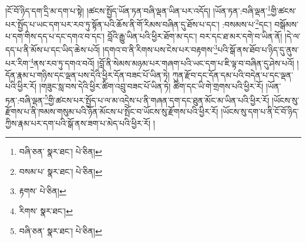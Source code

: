 །ངོ་བོ་ཉིད་དག་དྲི་མ་དག་པ་སྟེ། །ཚངས་སྤྱོད་ཡོན་ཏན་བཞི་ལྡན་ཡིན་པར་འདོད། །ཡོན་ཏན་:བཞི་ལྡན་\footnote{བཞི་ཅན་  སྣར་ཐང་།  པེ་ཅིན། }གྱི་ཚངས་པར་སྤྱོད་པ་ཡང་དག་པར་རབ་ཏུ་སྟོན་པའི་ཆོས་ནི་གོ་རིམས་བཞིན་དུ་ཐོས་པ་དང་། :བསམས་པ་\footnote{བསམ་པ་  སྣར་ཐང་།  པེ་ཅིན། }དང་། བསྒོམས་པ་དག་གིས་དད་པ་དང་དགའ་བ་དང་། བློའི་རྒྱུ་ཡིན་པའི་ཕྱིར་ཐོག་མ་དང་། བར་དང་ཐ་མར་དགེ་བ་ཡིན་ནོ། །དེ་ལ་དད་པ་ནི་མོས་པ་དང་ཡིད་ཆེས་པའོ། །དགའ་བ་ནི་རིགས་པས་ངེས་པར་བརྟགས་\footnote{རྟགས་  པེ་ཅིན། }པའི་སྒོ་ནས་ཐོབ་པ་ཉིད་དུ་ནུས་པར་རིག་\footnote{རིགས་  སྣར་ཐང་། }ནས་རབ་ཏུ་དགའ་བའོ། །བློ་ནི་སེམས་མཉམ་པར་གཞག་པའི་ཡང་དག་པ་ཇི་ལྟ་བ་བཞིན་དུ་ཤེས་པའོ། །དོན་རྣམ་པ་གཉིས་དང་ལྡན་པས་དེའི་ཕྱིར་དོན་བཟང་པོ་ཡིན་ཏེ། ཀུན་རྫོབ་དང་དོན་དམ་པའི་བདེན་པ་དང་ལྡན་པའི་ཕྱིར་རོ། །གཟུང་སླ་བས་དེའི་ཕྱིར་ཚིག་འབྲུ་བཟང་པོ་ཡིན་ཏེ། ཚིག་དང་ཡི་གེ་གྲགས་པའི་ཕྱིར་རོ། །ཡོན་ཏན་:བཞི་ལྡན་\footnote{བཞི་ཅན་  སྣར་ཐང་།  པེ་ཅིན། }གྱི་ཚངས་པར་སྤྱོད་པ་ལ་མ་འདྲེས་པ་ནི་གཞན་དག་དང་ཐུན་མོང་མ་ཡིན་པའི་ཕྱིར་རོ། །ཡོངས་སུ་རྫོགས་པ་ནི་ཁམས་གསུམ་པའི་ཉོན་མོངས་པ་སྤོང་བ་ཡོངས་སུ་རྫོགས་པའི་ཕྱིར་རོ། །ཡོངས་སུ་དག་པ་ནི་ངོ་བོ་ཉིད་ཀྱིས་རྣམ་པར་དག་པའི་སྒོ་ནས་ཟག་པ་མེད་པའི་ཕྱིར་རོ། །
